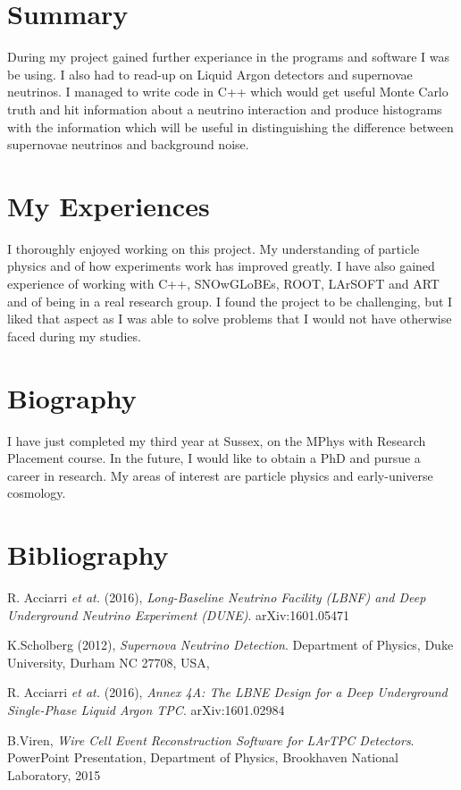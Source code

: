 \documentclass[a4paper,12,oneside,notitlepage]{report}
\begin{document}
\section*{\fontsize{11}{11}\selectfont Summary}
During my project gained further experiance in the programs and software I was be using. I also had to read-up on Liquid Argon detectors and supernovae neutrinos. I managed to write code in C++ which would get useful Monte Carlo truth and hit information about a neutrino interaction and produce histograms with the information which will be useful in distinguishing the difference between supernovae neutrinos and background noise.  

\newpage
\section*{\fontsize{11}{11}\selectfont My Experiences}
I thoroughly enjoyed working on this project. My understanding of particle physics and of how experiments work has improved greatly. I have also gained experience of working with C++, SNOwGLoBEs, ROOT, LArSOFT and ART and of being in a real research group. I found the project to be challenging, but I liked that aspect as I was able to solve problems that I would not have otherwise faced during my studies.

\section*{\fontsize{11}{11}\selectfont Biography}
I have just completed my third year at Sussex, on the MPhys with Research Placement course. In the future, I would like to obtain a PhD and pursue a career in research. My areas of interest are particle physics and early-universe cosmology.


\newpage
\section*{\fontsize{11}{11}\selectfont Bibliography}
\begin{thebibliography}{20}

	R. Acciarri \textit{et at.} (2016),
	\emph{Long-Baseline Neutrino Facility (LBNF) and
Deep Underground Neutrino Experiment (DUNE)}.
	arXiv:1601.05471
		 
	K.Scholberg (2012),
	\emph{Supernova Neutrino Detection}.
	Department of Physics, 
	Duke University, Durham NC 27708, USA,
	
	R. Acciarri \textit{et at.} (2016),
	\emph{Annex 4A: The LBNE Design for a Deep
Underground Single-Phase Liquid Argon TPC}.
	 arXiv:1601.02984
	
	B.Viren,
	\emph{Wire Cell Event Reconstruction Software
for LArTPC Detectors}.
	PowerPoint Presentation,
	Department of Physics,
	Brookhaven National Laboratory,
	2015	

\end{thebibliography}
\end{document}
